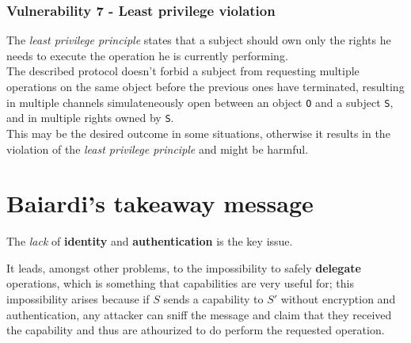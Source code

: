 \subsubsection{Vulnerability 7 - Least privilege violation}

The \textit{least privilege principle} states that a subject should own only the rights he needs to execute the operation he is currently performing.\\
The described protocol doesn't forbid a subject from requesting multiple operations on the same object before the previous ones have terminated,
resulting in multiple channels simulateneously open between an object \texttt{O} and a subject \texttt{S}, 
and in multiple rights owned by \texttt{S}.\\
This may be the desired outcome in some situations,
otherwise it results in the violation of the \textit{least privilege principle} and might be harmful.

\section{Baiardi's takeaway message}
The \textit{lack} of \textbf{identity} and \textbf{authentication} is the key issue.

It leads, amongst other problems, to the impossibility to safely \textbf{delegate} operations, which is something that capabilities are very useful for;
this impossibility arises because if $S$ sends a capability to $S'$ without encryption and authentication,
any attacker can sniff the message and claim that they received the capability and thus are athourized to do perform the requested operation.